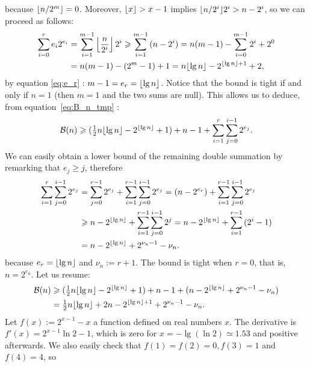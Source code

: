 because \(\lfloor{n/2^m}\rfloor = 0\). Moreover, \(\lfloor{x}\rfloor > x - 1\) implies
\(\lfloor{n/2^i}\rfloor 2^i > n - 2^i\), so we can proceed as follows:
\begin{align}
\sum_{i=0}^{r}{e_i2^{e_i}}
&= \sum_{i=1}^{m-1}{\left\lfloor\frac{n}{2^{i}}\right\rfloor2^{i}}
 \geqslant \sum_{i=1}^{m-1}{(n-2^i)}
 = n(m-1) - \sum_{i=0}^{m-1}{2^i} + 2^0\notag\\
&= n(m-1) - (2^m - 1) + 1
 = n\lfloor{\lg n}\rfloor - 2^{\lfloor{\lg n}\rfloor + 1} + 2,
\label{ineq:sum_ei_2ei_up}
\end{align}
by equation \eqref{eq:e_r} : \(m-1=e_r=\lfloor{\lg
  n}\rfloor\). Notice that the bound is tight if and only if \(n=1\) (then
\(m=1\) and the two sums are null). This allows us to deduce, from
equation~\eqref{eq:B_n_tmp} :
\begin{equation*}
\mathcal{B}(n) \geqslant 
(\tfrac{1}{2}n\lfloor{\lg n}\rfloor - 2^{\lfloor{\lg n}\rfloor} + 1)
+ n - 1 + \sum_{i=1}^{r}\sum_{j=0}^{i-1}{2^{e_j}}.
\end{equation*}
We can easily obtain a lower bound of the remaining double summation
by remarking that \(e_j \geqslant j\), therefore
\begin{align}
\sum_{i=1}^{r}\sum_{j=0}^{i-1}{2^{e_j}}
&=   \sum_{j=0}^{r-1}{2^{e_j}}
   + \sum_{i=1}^{r-1}\sum_{j=0}^{i-1}{2^{e_j}}
 = (n - 2^{e_r}) + \sum_{i=1}^{r-1}\sum_{j=0}^{i-1}{2^{e_j}}\notag\\
&\geqslant n - 2^{\lfloor{\lg n}\rfloor} + \sum_{i=1}^{r-1}\sum_{j=0}^{i-1}{2^j}
= n - 2^{\lfloor{\lg n}\rfloor} + \sum_{i=1}^{r-1}{(2^i-1)}\notag\\
&= n - 2^{\lfloor{\lg n}\rfloor} + 2^{\nu_n-1} - \nu_n.
\label{ineq:double_sum}
\end{align}
because \(e_r=\lfloor{\lg n}\rfloor\) and \(\nu_{n} := r + 1\). The
bound is tight when \(r=0\), that is, \(n=2^{e_0}\). Let us resume:
\begin{align*}
\mathcal{B}(n) 
&\geqslant (\tfrac{1}{2}n\lfloor{\lg n}\rfloor - 2^{\lfloor{\lg n}\rfloor} +
  1) + n - 1 + (n - 2^{\lfloor{\lg n}\rfloor} + 2^{\nu_n-1} - \nu_n)\\
&= \tfrac{1}{2}n\lfloor{\lg n}\rfloor + 2n - 2^{\lfloor{\lg n}\rfloor+1} + 2^{\nu_n-1} - \nu_n.
\end{align*}
Let \(f(x) := 2^{x-1} - x\) a function defined on real numbers
\(x\). The derivative is \(f'(x) = 2^{x-1}\ln 2 - 1\), which is zero
for \(x = -\lg(\ln 2) \simeq 1.53\) and positive afterwards. We also
easily check that \(f(1) = f(2) = 0, f(3) = 1\) and \(f(4) = 4\), so
